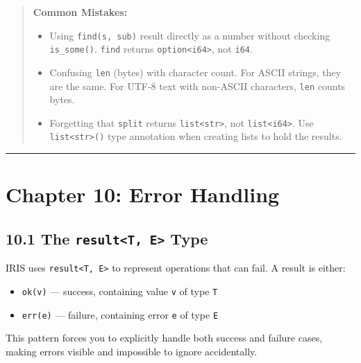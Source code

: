 \documentclass[
  english,
]{book}
\providecommand{\tightlist}{%
  \setlength{\itemsep}{0pt}\setlength{\parskip}{0pt}}
\begin{document}
\begin{quote}
\textbf{Common Mistakes:}

\begin{itemize}
\tightlist
\item
  Using \texttt{find(s,\ sub)} result directly as a number without
  checking \texttt{is\_some()}. \texttt{find} returns
  \texttt{option\textless{}i64\textgreater{}}, not \texttt{i64}.
\item
  Confusing \texttt{len} (bytes) with character count. For ASCII
  strings, they are the same. For UTF-8 text with non-ASCII characters,
  \texttt{len} counts bytes.
\item
  Forgetting that \texttt{split} returns
  \texttt{list\textless{}str\textgreater{}}, not
  \texttt{list\textless{}i64\textgreater{}}. Use
  \texttt{list\textless{}str\textgreater{}()} type annotation when
  creating lists to hold the results.
\end{itemize}
\end{quote}

\begin{center}\rule{0.5\linewidth}{0.5pt}\end{center}

\section{Chapter 10: Error Handling}\label{chapter-10-error-handling}

\subsection{\texorpdfstring{10.1 The
\texttt{result\textless{}T,\ E\textgreater{}}
Type}{10.1 The result\textless T, E\textgreater{} Type}}\label{the-resultt-e-type}

IRIS uses \texttt{result\textless{}T,\ E\textgreater{}} to represent
operations that can fail. A result is either:

\begin{itemize}
\tightlist
\item
  \texttt{ok(v)} --- success, containing value \texttt{v} of type
  \texttt{T}
\item
  \texttt{err(e)} --- failure, containing error \texttt{e} of type
  \texttt{E}
\end{itemize}

This pattern forces you to explicitly handle both success and failure
cases, making errors visible and impossible to ignore accidentally.
\end{document}
